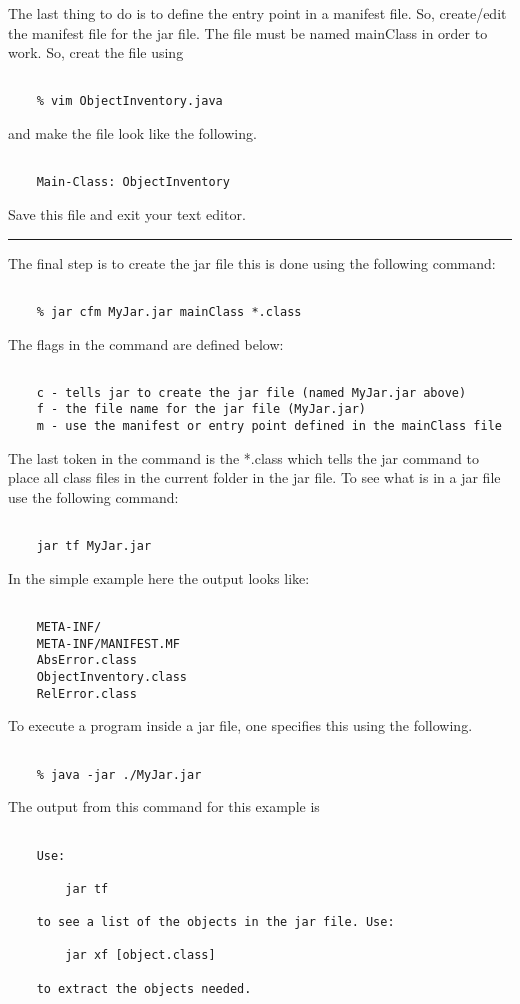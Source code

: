 \documentclass[10pt,fleqn]{article}
\begin{document}
\noindent
The last thing to do is to define the entry point in a manifest file. So,
create/edit the manifest file for the jar file. The file must be named mainClass
in order to work. So, creat the file using
\begin{verbatim}

    % vim ObjectInventory.java

\end{verbatim}
and make the file look like the following.
\begin{verbatim}

    Main-Class: ObjectInventory

\end{verbatim}
Save this file and exit your text editor.
\vskip0.1in\hrule\vskip0.1in
\noindent
The final step is to create the jar file this is done using the following
command:
\begin{verbatim}

    % jar cfm MyJar.jar mainClass *.class

\end{verbatim}
The flags in the command are defined below:
\begin{verbatim}

    c - tells jar to create the jar file (named MyJar.jar above)
    f - the file name for the jar file (MyJar.jar)
    m - use the manifest or entry point defined in the mainClass file

\end{verbatim}
The last token in the command is the *.class which tells the jar command to
place all class files in the current folder in the jar file. To see what is in
a jar file use the following command:
\begin{verbatim}

    jar tf MyJar.jar

\end{verbatim}
In the simple example here the output looks like:
\begin{verbatim}

    META-INF/
    META-INF/MANIFEST.MF
    AbsError.class
    ObjectInventory.class
    RelError.class

\end{verbatim}
To execute a program inside a jar file, one specifies this using the following.
\begin{verbatim}

    % java -jar ./MyJar.jar

\end{verbatim}
The output from this command for this example is
\begin{verbatim}

    Use:

        jar tf

    to see a list of the objects in the jar file. Use:

        jar xf [object.class]

    to extract the objects needed.

\end{verbatim}
\end{document}
